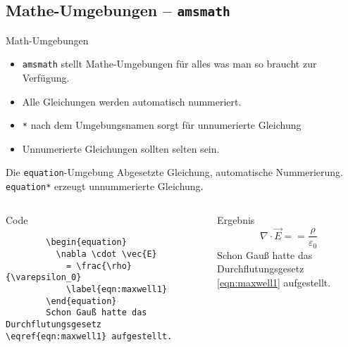 \subsection{Mathe-Umgebungen – \texttt{amsmath}}

\begin{frame}{Math-Umgebungen}
  \begin{itemize}
    \item \texttt{amsmath} stellt Mathe-Umgebungen für alles was man so braucht zur Verfügung.
      \item Alle Gleichungen werden automatisch nummeriert.
      \item \texttt{*} nach dem Umgebungsnamen sorgt für unnumerierte Gleichung
      \item Unnumerierte Gleichungen sollten selten sein.
  \end{itemize}
\end{frame}

\begin{frame}[fragile]{Die \texttt{equation}-Umgebung}
  Abgesetzte Gleichung, automatische Nummerierung. \\
  \texttt{equation*} erzeugt unnummerierte Gleichung.
  \begin{columns}[onlytextwidth, t]
    \begin{column}{0.60\textwidth}
      \begin{block}{Code}
        \begin{lstlisting}
        \begin{equation}
          \nabla \cdot \vec{E}
            = \frac{\rho}{\varepsilon_0}
            \label{eqn:maxwell1}
        \end{equation}
        Schon Gauß hatte das Durchflutungsgesetz \eqref{eqn:maxwell1} aufgestellt.
        \end{lstlisting}
      \end{block}
    \end{column}
    \begin{column}{0.36\textwidth}
      \begin{block}{Ergebnis}
        \begin{equation}
          \nabla \cdot \vec{E} =
            = \frac{\rho}{\varepsilon_0}
            \label{eqn:maxwell1}
        \end{equation}
        Schon Gauß hatte das Durchflutungsgesetz \eqref{eqn:maxwell1} aufgestellt.
      \end{block}
    \end{column}
  \end{columns}
\end{frame}

